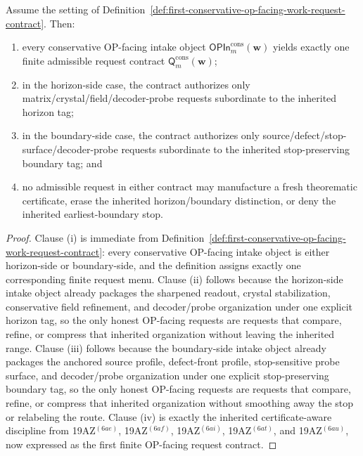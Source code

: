 \begin{proposition}
\label{prop:every-conservative-op-facing-intake-object-yields-exactly-one-finite-admissible-work-request-contract}
Assume the setting of Definition~\ref{def:first-conservative-op-facing-work-request-contract}. Then:
\begin{enumerate}[label=(\roman*)]
 \item every conservative OP-facing intake object \(\mathsf{OPIn}^{\mathrm{cons}}_{m}(\mathbf w)\) yields exactly one finite admissible request contract \(\mathsf{Q}^{\mathrm{cons}}_{m}(\mathbf w)\);
 \item in the horizon-side case, the contract authorizes only matrix/crystal/field/decoder-probe requests subordinate to the inherited horizon tag;
 \item in the boundary-side case, the contract authorizes only source/defect/stop-surface/decoder-probe requests subordinate to the inherited stop-preserving boundary tag; and
 \item no admissible request in either contract may manufacture a fresh theorematic certificate, erase the inherited horizon/boundary distinction, or deny the inherited earliest-boundary stop.
\end{enumerate}
\end{proposition}

\begin{proof}
Clause (i) is immediate from Definition~\ref{def:first-conservative-op-facing-work-request-contract}: every conservative OP-facing intake object is either horizon-side or boundary-side, and the definition assigns exactly one corresponding finite request menu. Clause (ii) follows because the horizon-side intake object already packages the sharpened readout, crystal stabilization, conservative field refinement, and decoder/probe organization under one explicit horizon tag, so the only honest OP-facing requests are requests that compare, refine, or compress that inherited organization without leaving the inherited range. Clause (iii) follows because the boundary-side intake object already packages the anchored source profile, defect-front profile, stop-sensitive probe surface, and decoder/probe organization under one explicit stop-preserving boundary tag, so the only honest OP-facing requests are requests that compare, refine, or compress that inherited organization without smoothing away the stop or relabeling the route. Clause (iv) is exactly the inherited certificate-aware discipline from 19AZ$^{(6ae)}$, 19AZ$^{(6af)}$, 19AZ$^{(6ai)}$, 19AZ$^{(6at)}$, and 19AZ$^{(6au)}$, now expressed as the first finite OP-facing request contract.
\end{proof}

